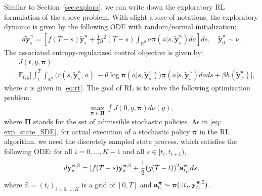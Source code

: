 \documentclass[11pt]{article}
\newcommand{\bpi}{\boldsymbol{\pi}}
\newcommand{\bPi}{\boldsymbol{\Pi}}
\begin{document}
Similar to Section~\ref{sec:explora}, we can write down the exploratory RL formulation of the above problem. With slight abuse of notations, the exploratory dynamic is given by the following ODE with random/normal initialization:
        \begin{align}\label{eq: exp_state_ODE}
        d \tilde {\mathbf{y}}^{\bpi}_s= \left[f(T- s) \tilde{\mathbf{y}}^{\bpi}_{s} + \frac{1}{2} g^2(T-s) {\int_{\mathbb{R}^d} a {\bpi}(a|s, \tilde {\mathbf{y}}^{\bpi}_s ) da} \right]  ds , \quad \tilde{\mathbf{y}}_{0}^{\bpi} \sim\nu.
    \end{align}
The associated entropy-regularized control objective is given by:
\begin{align} \label{eq: value_function_ode}
        &J(t, y, \bpi) \nonumber\\
        = &\mathbb{E}_{t,y}\bigg[  \int_t^T \int_{\mathbb{R}^d} \big( {r(s, \tilde{\mathbf{y}}_s^{\bpi}, a)}\ - { \theta \log \bpi(a|s, \tilde{\mathbf{y}}_{s}^{\bpi})\big) \bpi(a|s, \tilde{\mathbf{y}}_{s}^{\bpi}) da} ds + {\beta h(\tilde{\mathbf{y}}_T^{\bpi} )}\bigg],
    \end{align}
 where $r$ is given in \eqref{eq:rt}. The goal of RL is to solve the following optimization problem:
\begin{align}\label{eq:Jstar-ODE}
	\max_{\bpi \in \bPi} \int J(0, y, \bpi) d \nu(y),
\end{align}
where $\boldsymbol{\Pi}$ stands for the set of admissible stochastic policies. As in \eqref{eq: exp_state_SDE}, for actual execution of a stochastic policy $\bpi$ in the RL algorithm, we need the discretely sampled state process, which satisfies the following ODE: for all $i = 0, . . . , K - 1$ and all $s \in [t_{i}, t_{i+1})$,
\begin{align} \label{eq:samplestate-ode}
d \mathbf{y}^{\bpi, \mathbb{S}}_s
= [f(T-s) \mathbf{y}^{\bpi, \mathbb{S}}_s + \frac{1}{2}(g(T-t))^{2} {\bf a}^{\bpi}_{t_i} ] ds,
\end{align}
where $\mathbb{S}= (t_i)_{i=0, \ldots, K}$ is a grid of $[0, T]$ and ${\bf a}^{\bpi}_{t_i} \sim \bpi(\cdot|t_i, \mathbf{y}^{\bpi, \mathbb{S}}_{t_i})$.
\end{document}
